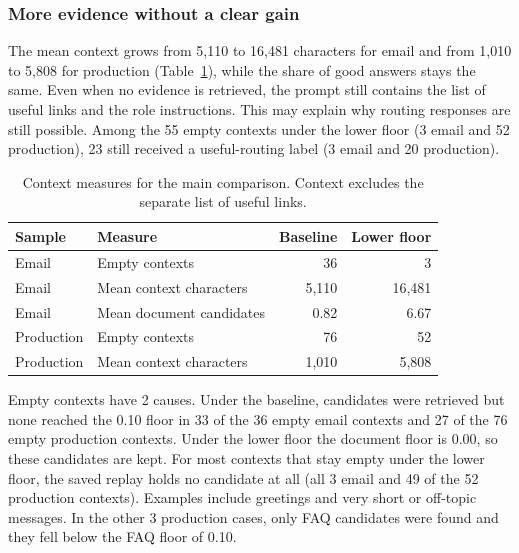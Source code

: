 \subsubsection{More evidence without a clear gain}
\label{sec:more-evidence}

The mean context grows from 5,110 to 16,481 characters for email and from 1,010 to 5,808 for production (Table~\ref{tab:context-diagnostics}), while the share of good answers stays the same. Even when no evidence is retrieved, the prompt still contains the list of useful links and the role instructions. This may explain why routing responses are still possible. Among the 55 empty contexts under the lower floor (3 email and 52 production), 23 still received a useful-routing label (3 email and 20 production).

\begin{table}[htbp]
\centering
\caption[Context measures for the main comparison]{Context measures for the main comparison. Context excludes the separate list of useful links.}
\label{tab:context-diagnostics}
\begin{tabular}{llrr}
\toprule
Sample & Measure & Baseline & Lower floor \\
\midrule
Email & Empty contexts & 36 & 3 \\
Email & Mean context characters & 5,110 & 16,481 \\
Email & Mean document candidates & 0.82 & 6.67 \\
Production & Empty contexts & 76 & 52 \\
Production & Mean context characters & 1,010 & 5,808 \\
\bottomrule
\end{tabular}
\end{table}

Empty contexts have 2 causes. Under the baseline, candidates were retrieved but none reached the 0.10 floor in 33 of the 36 empty email contexts and 27 of the 76 empty production contexts. Under the lower floor the document floor is 0.00, so these candidates are kept. For most contexts that stay empty under the lower floor, the saved replay holds no candidate at all (all 3 email and 49 of the 52 production contexts). Examples include greetings and very short or off-topic messages. In the other 3 production cases, only FAQ candidates were found and they fell below the FAQ floor of 0.10.

